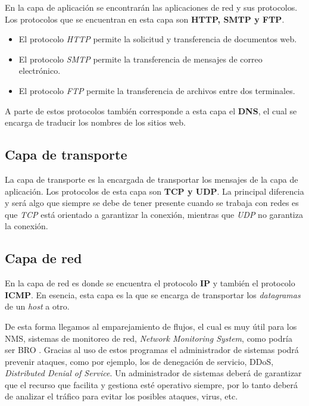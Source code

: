 En la capa de aplicación se encontrarán las aplicaciones de red y sus protocolos. 
Los protocolos que se encuentran en esta capa son \textbf{HTTP, SMTP y FTP}. 
\intro
\begin{itemize}
\item El protocolo \textit{HTTP} permite la solicitud y transferencia de documentos web.
\item El protocolo \textit{SMTP} permite la transferencia de mensajes de correo electrónico.
\item El protocolo \textit{FTP} permite la transferencia de archivos entre dos terminales.
\end{itemize}

A parte de estos protocolos también corresponde a esta capa el \textbf{DNS}, el cual se encarga 
de traducir los nombres de los sitios web.

\subsection{Capa de transporte}

La capa de transporte es la encargada de transportar los mensajes de la capa de aplicación. 
Los protocolos de esta capa son \textbf{TCP y UDP}. La principal diferencia y será algo que 
siempre se debe de tener presente cuando se trabaja con redes es que \textit{TCP} está orientado 
a garantizar la conexión, mientras que \textit{UDP} no garantiza la conexión.

\subsection{Capa de red}

En la capa de red es donde se encuentra el protocolo \textbf{IP} y también el protocolo \textbf{ICMP}.
\intro
En esencia, esta capa es la que se encarga de transportar los \textit{datagramas} de un \textit{host} a otro.

\intro De esta forma llegamos al emparejamiento de flujos, el cual es muy útil para los NMS, 
sistemas de monitoreo de red, \textit{Network Monitoring System}, como podría ser BRO \cite{broindex}.
Gracias al uso de estos programas el administrador de sistemas podrá prevenir ataques, como por ejemplo, los 
de denegación de servicio, DDoS, \textit{Distributed Denial of Service}. Un administrador de sistemas deberá de 
garantizar que el recurso que facilita y gestiona esté operativo siempre, por lo tanto deberá de analizar el 
tráfico para evitar los posibles ataques, virus, etc.


